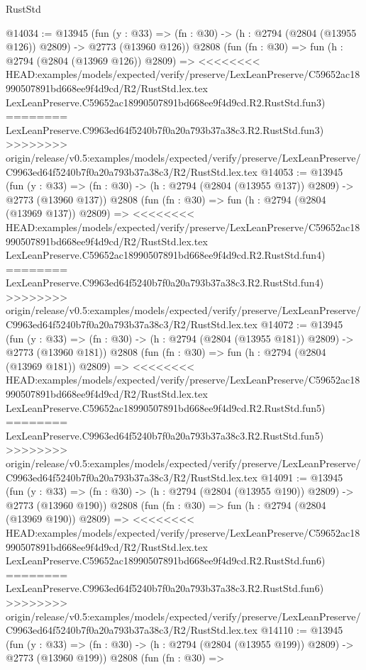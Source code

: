 \begin{lexlean}{RustStd}
\begin{coremodule}
{\begin{coremodule}
{{{{{{{{{{{{{{{{{{{{{{{{{{@14034 := @13945
    (fun (y : @33) => (fn : @30) -> (h : @2794 (@2804 (@13955 @126)) @2809) -> @2773 (@13960 @126))
    @2808
    (fun (fn : @30) =>
    fun (h : @2794 (@2804 (@13969 @126)) @2809) =>
<<<<<<<< HEAD:examples/models/expected/verify/preserve/LexLeanPreserve/C59652ac18990507891bd668ee9f4d9cd/R2/RustStd.lex.tex
    LexLeanPreserve.C59652ac18990507891bd668ee9f4d9cd.R2.RustStd.fun3)
========
    LexLeanPreserve.C9963ed64f5240b7f0a20a793b37a38c3.R2.RustStd.fun3)
>>>>>>>> origin/release/v0.5:examples/models/expected/verify/preserve/LexLeanPreserve/C9963ed64f5240b7f0a20a793b37a38c3/R2/RustStd.lex.tex
@14053 := @13945
    (fun (y : @33) => (fn : @30) -> (h : @2794 (@2804 (@13955 @137)) @2809) -> @2773 (@13960 @137))
    @2808
    (fun (fn : @30) =>
    fun (h : @2794 (@2804 (@13969 @137)) @2809) =>
<<<<<<<< HEAD:examples/models/expected/verify/preserve/LexLeanPreserve/C59652ac18990507891bd668ee9f4d9cd/R2/RustStd.lex.tex
    LexLeanPreserve.C59652ac18990507891bd668ee9f4d9cd.R2.RustStd.fun4)
========
    LexLeanPreserve.C9963ed64f5240b7f0a20a793b37a38c3.R2.RustStd.fun4)
>>>>>>>> origin/release/v0.5:examples/models/expected/verify/preserve/LexLeanPreserve/C9963ed64f5240b7f0a20a793b37a38c3/R2/RustStd.lex.tex
@14072 := @13945
    (fun (y : @33) => (fn : @30) -> (h : @2794 (@2804 (@13955 @181)) @2809) -> @2773 (@13960 @181))
    @2808
    (fun (fn : @30) =>
    fun (h : @2794 (@2804 (@13969 @181)) @2809) =>
<<<<<<<< HEAD:examples/models/expected/verify/preserve/LexLeanPreserve/C59652ac18990507891bd668ee9f4d9cd/R2/RustStd.lex.tex
    LexLeanPreserve.C59652ac18990507891bd668ee9f4d9cd.R2.RustStd.fun5)
========
    LexLeanPreserve.C9963ed64f5240b7f0a20a793b37a38c3.R2.RustStd.fun5)
>>>>>>>> origin/release/v0.5:examples/models/expected/verify/preserve/LexLeanPreserve/C9963ed64f5240b7f0a20a793b37a38c3/R2/RustStd.lex.tex
@14091 := @13945
    (fun (y : @33) => (fn : @30) -> (h : @2794 (@2804 (@13955 @190)) @2809) -> @2773 (@13960 @190))
    @2808
    (fun (fn : @30) =>
    fun (h : @2794 (@2804 (@13969 @190)) @2809) =>
<<<<<<<< HEAD:examples/models/expected/verify/preserve/LexLeanPreserve/C59652ac18990507891bd668ee9f4d9cd/R2/RustStd.lex.tex
    LexLeanPreserve.C59652ac18990507891bd668ee9f4d9cd.R2.RustStd.fun6)
========
    LexLeanPreserve.C9963ed64f5240b7f0a20a793b37a38c3.R2.RustStd.fun6)
>>>>>>>> origin/release/v0.5:examples/models/expected/verify/preserve/LexLeanPreserve/C9963ed64f5240b7f0a20a793b37a38c3/R2/RustStd.lex.tex
@14110 := @13945
    (fun (y : @33) => (fn : @30) -> (h : @2794 (@2804 (@13955 @199)) @2809) -> @2773 (@13960 @199))
    @2808
    (fun (fn : @30) =>
}}}}}}}}}}}}}}}}}}}}}}}}}}
\end{coremodule}}
\end{coremodule}
\end{lexlean}
